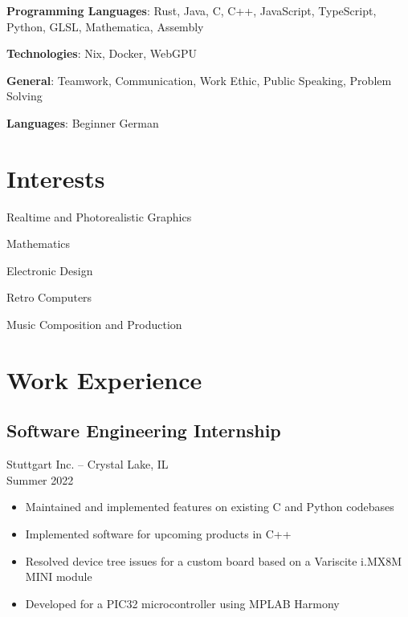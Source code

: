 \documentclass[letterpaper,10pt]{article}
\begin{document}
\begin{paracol}{2}
    \textbf{Programming Languages}: Rust, Java, C, C++, JavaScript, TypeScript, Python, GLSL, Mathematica, Assembly

    \medskip

    \textbf{Technologies}: Nix, Docker, WebGPU

    \medskip

    \textbf{General}: Teamwork, Communication, Work Ethic, Public Speaking, Problem Solving

    \medskip

    \textbf{Languages}: Beginner German

    \section*{Interests}

    Realtime and Photorealistic Graphics

    \medskip

    Mathematics

    \medskip

    Electronic Design

    \medskip

    Retro Computers

    \medskip

    Music Composition and Production

    \switchcolumn

    \section*{Work Experience}

    \subsection*{Software Engineering Internship}
    Stuttgart Inc. -- Crystal Lake, IL \\
    Summer 2022

    \begin{itemize}[topsep=0.5em, partopsep=0em, itemsep=0.125em]
        \item Maintained and implemented features on existing C and Python codebases
        \item Implemented software for upcoming products in C++
        \item Resolved device tree issues for a custom board based on a Variscite i.MX8M MINI module
        \item Developed for a PIC32 microcontroller using MPLAB Harmony
    \end{itemize}


\end{paracol}
\end{document}
